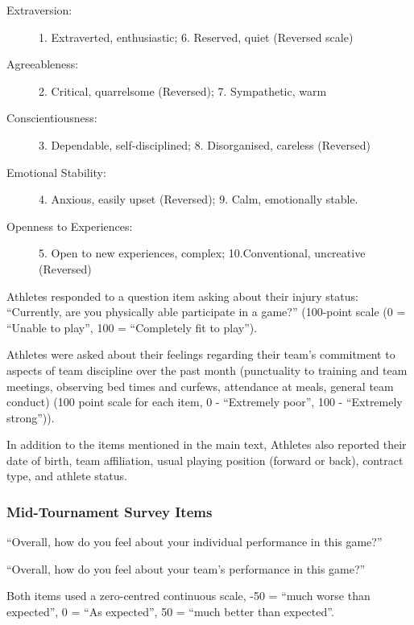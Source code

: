 \begin{CJK}{UTF8}{gbsn}
\begin{description}
\item [Extraversion:] 1. Extraverted, enthusiastic; 6. Reserved, quiet (Reversed scale)
\item [Agreeableness:] 2. Critical, quarrelsome (Reversed); 7. Sympathetic, warm
\item [Conscientiousness:] 3. Dependable, self-disciplined; 8. Disorganised, careless (Reversed)
\item [Emotional Stability:] 4. Anxious, easily upset (Reversed); 9. Calm, emotionally stable.
\item [Openness to Experiences:] 5. Open to new experiences, complex; 10.Conventional, uncreative (Reversed)
\end{description}


Athletes responded to a question item asking about their injury status: ``Currently, are you physically able participate in a game?'' (100-point scale (0 = ``Unable to play'', 100 = ``Completely fit to play'').

Athletes were asked about their feelings regarding their team's commitment to aspects of team discipline over the past month (punctuality to training and team meetings, observing bed times and curfews, attendance at meals, general team conduct) (100 point scale for each item, 0 - ``Extremely poor'', 100 - ``Extremely strong'')).


In addition to the items mentioned in the main text, Athletes also reported their date of birth, team affiliation, usual playing position (forward or back), contract type, and athlete status.






\subsubsection{Mid-Tournament Survey Items\label{app8:surveyMid}}

\begin{description}[labelindent=1cm]
\item [Individual Performance Expectations]``Overall, how do you feel about your individual performance in this game?''
\item [Team Performance Expectations] ``Overall, how do you feel about your team's performance in this game?''
\end{description}
Both items used a zero-centred continuous scale, -50 = ``much worse than expected'', 0 =  ``As expected'', 50 =  ``much better than expected''.


\end{CJK}
